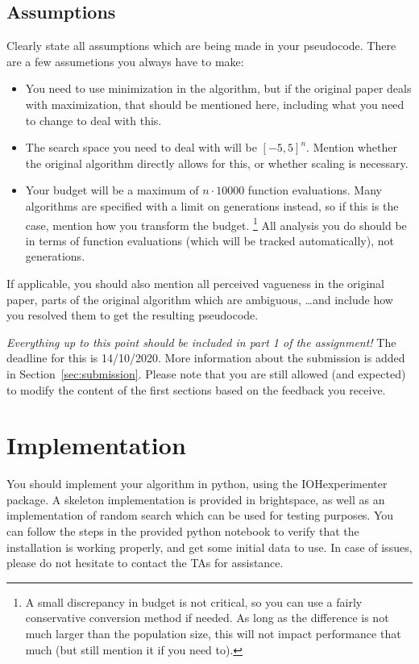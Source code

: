 \documentclass[runningheads]{llncs}
\begin{document}
\subsection{Assumptions}
Clearly state all assumptions which are being made in your pseudocode. 
There are a few assumetions you always have to make:
\begin{itemize}
    \item You need to use minimization in the algorithm, but if the original paper deals with maximization, that should be mentioned here, including what you need to change to deal with this.
    \item The search space you need to deal with will be $[-5,5]^{n}$. Mention whether the original algorithm directly allows for this, or whether scaling is necessary.
    \item Your budget will be a maximum of $n \cdot 10000$ function evaluations. Many algorithms are specified with a limit on generations instead, so if this is the case, mention how you transform the budget. \footnote{A small discrepancy in budget is not critical, so you can use a fairly conservative conversion method if needed. As long as the difference is not much larger than the population size, this will not impact performance that much (but still mention it if you need to).} All analysis you do should be in terms of function evaluations (which will be tracked automatically), not generations.
\end{itemize}
If applicable, you should also mention all perceived vagueness in the original paper, parts of the original algorithm which are ambiguous, \dots and include how you resolved them to get the resulting pseudocode.

\emph{Everything up to this point should be included in part 1 of the assignment!} The deadline for this is 14/10/2020. More information about the submission is added in Section~\ref{sec:submission}. Please note that you are still allowed (and expected) to modify the content of the first sections based on the feedback you receive.

\section{Implementation}

You should implement your algorithm in python, using the IOHexperimenter~\cite{IOHprofiler} package. A skeleton implementation is provided in brightspace, as well as an implementation of random search which can be used for testing purposes. You can follow the steps in the provided python notebook to verify that the installation is working properly, and get some initial data to use. In case of issues, please do not hesitate to contact the TAs for assistance. 
\end{document}
